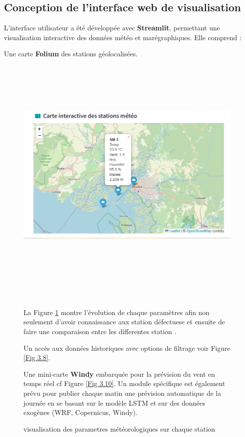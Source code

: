 \documentclass[a4paper,12pt,openany]{report}
\begin{document}
\subsection{Conception de l’interface web de visualisation}
L’interface utilisateur a été développée avec \textbf{Streamlit}, permettant une visualisation interactive des données météo et marégraphiques. Elle comprend :
\begin{enumerate}
	\item Une carte \textbf{Folium} des stations géolocalisées.
	
	\begin{figure}[H]
		\begin{center}
		 \begin{minipage}{\textwidth}
		 	
		    \begin{center}
		    \includegraphics[width=1\textwidth,height=4.6in]{images/SITE_PAD3.png}
		    \caption{visualisation des parametres météorologiques sur chaque station \label{Fig 3.7} }
		    \end{center}
		    \end{minipage}	\\
		    	
			\quad
			
			\centering
		La Figure \ref{Fig 3.7}  montre l'évolution de chaque paramètres  afin non seulement d'avoir connaissance aux station défectuese et ensuite de faire une comparaison entre les differentes station .
		\item Un accès aux données historiques avec options de filtrage voir Figure \ref{Fig 3.8}.
		\item Une mini-carte \textbf{Windy} embarquée pour la prévision du vent en temps réel cf Figure \ref{Fig 3.10}.
		Un module spécifique est également prévu pour publier chaque matin une prévision automatique de la journée en se basant sur le modèle LSTM et sur des données exogènes (WRF, Copernicus, Windy).
			

\end{center}
\end{figure}
\end{enumerate}
\end{document}
